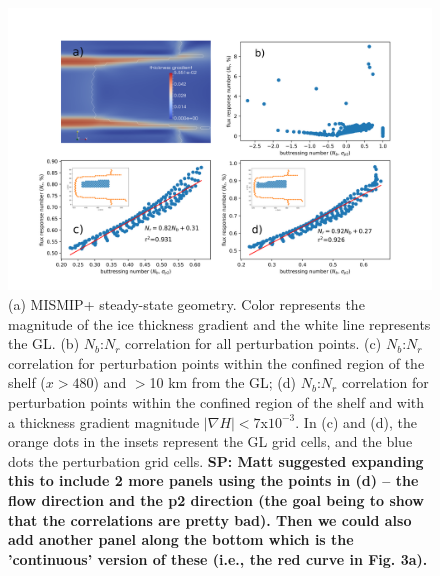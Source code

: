 \documentclass[review,oneside]{igs}
\begin{document}

\begin{figure}
\centering
\includegraphics[width=1\linewidth]{figs/mismip_Nb_GLF_regression.pdf}
    \caption{(a) MISMIP+ steady-state geometry. Color represents the magnitude of the ice thickness gradient and the white line represents the GL. (b) $N_b$:$N_r$ correlation for all perturbation points. (c) $N_b$:$N_r$ correlation for perturbation points within the confined region of the shelf ($x>480$) and $>$10 km from the GL; (d) $N_b$:$N_r$ correlation for perturbation points within the confined region of the shelf and with a thickness gradient magnitude $\left|\nabla H\right|<7$x$10^{-3}$. In (c) and (d), the orange dots in the insets represent the GL grid cells, and the blue dots the perturbation grid cells. \textbf{SP: Matt suggested expanding this to include 2 more panels using the points in (d) -- the flow direction and the p2 direction (the goal being to show that the correlations are pretty bad). Then we could also add another panel along the bottom which is the 'continuous' version of these (i.e., the red curve in Fig. 3a).}}
\label{mismip_Nb_GLF_regression}
\end{figure}
\end{document}
